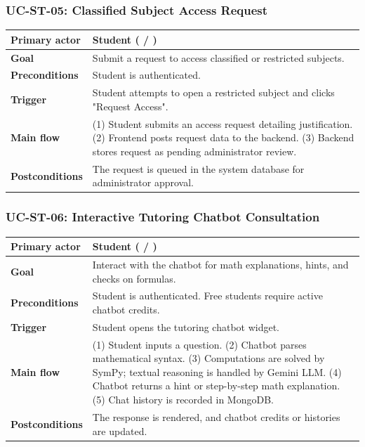 \subsubsection{UC-ST-05: Classified Subject Access Request}
\begin{longtable}{L{0.28\textwidth}L{0.62\textwidth}}
\textbf{Primary actor} & Student ( / ) \\ \hline
\textbf{Goal} & Submit a request to access classified or restricted subjects. \\ \hline
\textbf{Preconditions} & Student is authenticated. \\ \hline
\textbf{Trigger} & Student attempts to open a restricted subject and clicks "Request Access". \\ \hline
\textbf{Main flow} & (1) Student submits an access request detailing justification. (2) Frontend posts request data to the backend. (3) Backend stores request as pending administrator review. \\ \hline
\textbf{Postconditions} & The request is queued in the system database for administrator approval. \\
\end{longtable}

\subsubsection{UC-ST-06: Interactive Tutoring Chatbot Consultation}
\begin{longtable}{L{0.28\textwidth}L{0.62\textwidth}}
\textbf{Primary actor} & Student ( / ) \\ \hline
\textbf{Goal} & Interact with the chatbot for math explanations, hints, and checks on formulas. \\ \hline
\textbf{Preconditions} & Student is authenticated. Free students require active chatbot credits. \\ \hline
\textbf{Trigger} & Student opens the tutoring chatbot widget. \\ \hline
\textbf{Main flow} & (1) Student inputs a question. (2) Chatbot parses mathematical syntax. (3) Computations are solved by SymPy; textual reasoning is handled by Gemini LLM. (4) Chatbot returns a hint or step-by-step math explanation. (5) Chat history is recorded in MongoDB. \\ \hline
\textbf{Postconditions} & The response is rendered, and chatbot credits or histories are updated. \\
\end{longtable}

